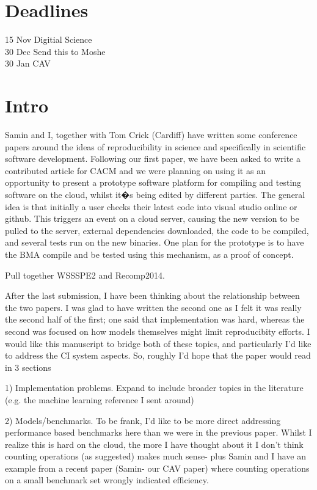 \documentclass{article}
\begin{document}


\section{Deadlines}
15 Nov Digitial Science \\
30 Dec Send this to Moshe \\
30 Jan CAV

\section{Intro}


Samin and I, together with Tom Crick (Cardiff) have written
some conference papers around the ideas of reproducibility in science
and specifically in scientific software development. Following our
first paper, we have been asked to write a contributed article for
CACM and we were planning on using it as an opportunity to present a
prototype software platform for compiling and testing software on the
cloud, whilst it�s being edited by different parties. The general
idea is that initially a user checks their latest code into visual
studio online or github. This triggers an event on a cloud server,
causing the new version to be pulled to the server, external
dependencies downloaded, the code to be compiled, and several tests
run on the new binaries. One plan for the prototype is to have the BMA
compile and be tested using this mechanism, as a proof of concept.


Pull together WSSSPE2 and Recomp2014. 


After the last submission, I have been thinking about the relationship
between the two papers. I was glad to have written the second one as I
felt it was really the second half of the first; one said that
implementation was hard, whereas the second was focused on how models
themselves might limit reproducibity efforts. I would like this
manuscript to bridge both of these topics, and particularly I'd like
to address the CI system aspects. So, roughly I'd hope that the paper
would read in 3 sections

 

1) Implementation problems. Expand to include broader topics in the
literature (e.g. the machine learning reference I sent around)

 

2) Models/benchmarks. To be frank, I'd like to be more direct
addressing performance based benchmarks here than we were in the
previous paper. Whilst I realize this is hard on the cloud, the more I
have thought about it I don't think counting operations (as suggested)
makes much sense- plus Samin and I have an example from a recent paper
(Samin- our CAV paper) where counting operations on a small benchmark
set wrongly indicated efficiency.
\end{document}

